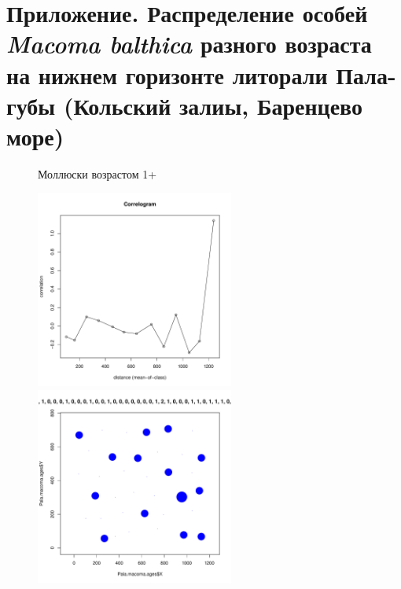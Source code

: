 \section{Приложение. Распределение особей {\it Macoma balthica} разного возраста на нижнем горизонте литорали Пала-губы (Кольский залиы, Баренцево море)}
\label{app:Pala_MoranI_ages}


	\begin{figure}[h]
	\begin{minipage}[b]{\linewidth}
	\begin{center}
		Моллюски возрастом 1+
	\end{center}
	\end{minipage}

	\begin{minipage}[b]{.46\linewidth}
	\begin{center}
		\includegraphics[width=65mm]{../Barenc_Sea/distribution_Moran/Pala_macoma_age_N1_.pdf}
	\end{center}
	\end{minipage}
%
	\hfil %
%
	\begin{minipage}[b]{.46\linewidth}
	\begin{center}
		\includegraphics[width=65mm]{../Barenc_Sea/distribution_Moran/Pala_macoma_age_bubb_N1_.pdf}
	\end{center}
	\end{minipage}


\end{figure}
